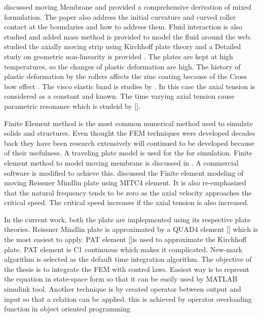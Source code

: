 \documentclass[main.tex]{subfiles}
\begin{document}
 \cite{moving_membrane_with_air_roller} discussed moving Membrane and provided a comprehensive derivation of mixed formulation. The paper also address the initial curvature and curved roller contact at the boundaries and how to address them. Fluid interaction is also studied and added mass method is provided to model the fluid around the web. \cite{SAXINGER2016190} studied the axially moving strip using Kirchhoff plate theory and a Detailed study on geometric non-linearity is provided .
The plates are kept at high temperatures, so the changes of plastic deformation are high. The history of plastic deformation by the rollers affects the zinc coating because of the Cross bow effect \cite{Baumgart2017}. The visco elastic band is studies by \cite{NumMethodBookString2013}.  In this case the axial tension is considered as a constant and known. The time varying axial tension cause parametric resonance which is studeid by [\cite{KIM2003679}].



Finite Element method is the most common numerical method used to simulate solids and structures. Even thought the FEM techniques were developed decades back they have been research extensively will continued to be developed because of their usefulness. A traveling plate model is used for the for simulation. Finite element method to model moving membrane is discussed in \cite{non_moving_mem_fem}. A commercial software is modified to achieve this. \cite{WANG1999467} discussed the Finite element modeling of moving Reissner Mindlin plate using MITC4 element. It is also re-emphasized  that the natural frequency tends to be zero as the axial velocity approaches the critical speed. The critical speed increases if the axial tension is also increased. 


 

In the current work, both the plate are implepmented using its respective plate theories. Reissner Mindlin plate is approximated by a QUAD4 element [\cite{MATLAB_FEM}] which is the most easiest to apply. PAT element [\cite{ZIENKIE_BOOK_STRUCT_CH11}]is used to approximate the Kirchhoff plate. PAT element is C1 continuous which makes it complicated. New-mark algorithm is selected as the default time integration algorithm.  The objective of the thesis is to integrate the FEM with control laws. Easiest way is to represnt the equation in state-space form \cite{FEM_MATLAB} so that it can be easily used by MATLAB simulink tool. Another technique is by created operator between output and input so that a relation can be applied. this is achieved by operator overloading function in object oriented programming
\end{document}
